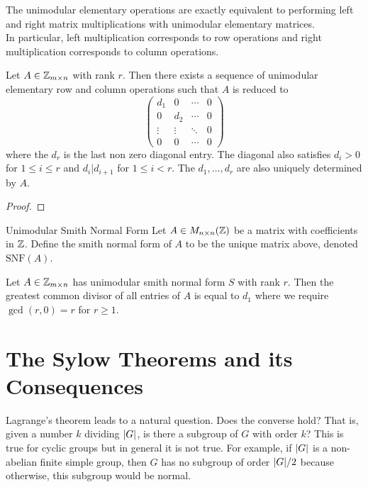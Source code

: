 \documentclass[a4paper]{article}
\begin{document}
\begin{prp}{}{} The unimodular elementary operations are exactly equivalent to performing left and right matrix multiplications with unimodular elementary matrices. \\
In particular, left multiplication corresponds to row operations and right multiplication corresponds to column operations. 
\end{prp}

\begin{thm}{}{} Let $A\in\mathbb{Z}_{m\times n}$ with rank $r$. Then there exists a sequence of unimodular elementary row and column operations such that $A$ is reduced to $$\begin{pmatrix}
d_1 & 0 & \cdots & 0\\
0 & d_2 & \cdots & 0\\
\vdots & \vdots & \ddots & 0\\
0 & 0 & \cdots & 0
\end{pmatrix}$$ where the $d_r$ is the last non zero diagonal entry. The diagonal also satisfies $d_i>0$ for $1\leq i\leq r$ and $d_i|d_{i+1}$ for $1\leq i<r$. The $d_1,\dots,d_r$ are also uniquely determined by $A$. 
\begin{proof}
\end{proof}
\end{thm}

\begin{defn}{Unimodular Smith Normal Form}{} Let $A\in M_{n\times n}(\mathbb{Z})$ be a matrix with coefficients in $\mathbb{Z}$. Define the smith normal form of $A$ to be the unique matrix above, denoted $\text{SNF}(A)$. 
\end{defn}

\begin{lmm}{}{} Let $A\in\mathbb{Z}_{m\times n}$ has unimodular smith normal form $S$ with rank $r$. Then the greatest common divisor of all entries of $A$ is equal to $d_1$ where we require $\gcd(r,0)=r$ for $r\geq 1$. 
\end{lmm}

\pagebreak
\section{The Sylow Theorems and its Consequences}
Lagrange's theorem leads to a natural question. Does the converse hold? That is, given a number $k$ dividing $\abs{G}$, is there a subgroup of $G$ with order $k$? This is true for cyclic groups but in general it is not true. For example, if $\abs{G}$ is a non-abelian finite simple group, then $G$ has no subgroup of order $\abs{G}/2$ because otherwise, this subgroup would be normal. \\
\end{document}
